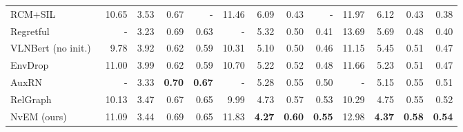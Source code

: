 \documentclass[sigconf]{acmart}
\begin{document}
\begin{table*}[htbp]
{\begin{tabular}{lrrrrrrrrrrrr}
			RCM+SIL~\cite{wang2019rcm}
			& 10.65 & 3.53 & 0.67 & -    & 11.46 & 6.09 & 0.43 & -    & 11.97 & 6.12 & 0.43 & 0.38 \\
			Regretful~\cite{ma2019regretful}
			& -     & 3.23 & 0.69 & 0.63 & -     & 5.32 & 0.50 & 0.41 & 13.69 & 5.69 & 0.48 & 0.40 \\
			VLNBert (no init.)~\cite{hong2020vln-bert} & 9.78 & 3.92 & 0.62 & 0.59 & 10.31 & 5.10 & 0.50 & 0.46 & 11.15 & 5.45 & 0.51 & 0.47 \\
			EnvDrop~\cite{tan2019envdrop}
			& 11.00 & 3.99 & 0.62 & 0.59 & 10.70 & 5.22 & 0.52 & 0.48 & 11.66 & 5.23 & 0.51 & 0.47 \\
			AuxRN~\cite{zhu2020self-supervised}
			& -     & 3.33 & \textbf{0.70} & \textbf{0.67} & -     & 5.28 & 0.55 & 0.50 & -     & 5.15 & 0.55 & 0.51 \\
			RelGraph~\cite{hong2020relgraph}                  & 10.13 & 3.47 & 0.67 & 0.65 & 9.99  & 4.73 & 0.57 & 0.53 & 10.29 & 4.75 & 0.55 & 0.52 \\
			NvEM (ours) & 11.09 & 3.44 & 0.69 & 0.65 & 11.83 & \textbf{4.27} & \textbf{0.60} & \textbf{0.55} & 12.98 & \textbf{4.37} & \textbf{0.58} & \textbf{0.54} \\
			\bottomrule
	\end{tabular}}
\end{table*}
\end{document}
